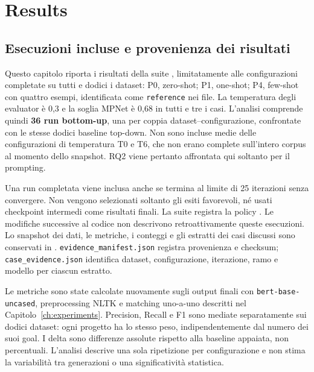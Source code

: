\chapter{Results}
\label{ch:results}

\section{Esecuzioni incluse e provenienza dei risultati}
Questo capitolo riporta i risultati della suite
, limitatamente alle configurazioni
completate su tutti e dodici i dataset: P0, zero-shot; P1, one-shot;
P4, few-shot con quattro esempi, identificata come \texttt{reference} nei file.
La temperatura degli evaluator \`e 0,3 e la soglia MPNet \`e 0,68 in tutti
e tre i casi. L'analisi comprende quindi \textbf{36 run bottom-up}, una
per coppia dataset--configurazione, confrontate con le stesse dodici
baseline top-down. Non sono incluse medie delle configurazioni di
temperatura T0 e T6, che non erano complete sull'intero corpus al momento
dello snapshot. RQ2 viene pertanto affrontata qui soltanto per il prompting.

Una run completata viene inclusa anche se termina al limite di 25
iterazioni senza convergere. Non vengono selezionati soltanto gli esiti
favorevoli, n\'e usati checkpoint intermedi come risultati finali.
La suite registra la policy
.
Le modifiche successive al codice non descrivono retroattivamente queste
esecuzioni. Lo snapshot dei dati, le metriche, i conteggi e gli estratti
dei casi discussi sono conservati in
.
\texttt{evidence\_manifest.json} registra provenienza e checksum;
\texttt{case\_evidence.json} identifica dataset, configurazione,
iterazione, ramo e modello per ciascun estratto.

Le metriche sono state calcolate nuovamente sugli output finali con
\texttt{bert-base-uncased}, preprocessing NLTK e matching uno-a-uno
descritti nel Capitolo~\ref{ch:experiments}. Precision, Recall e F1 sono
mediate separatamente sui dodici dataset: ogni progetto ha lo stesso
peso, indipendentemente dal numero dei suoi goal. I delta sono differenze
assolute rispetto alla baseline appaiata, non percentuali. L'analisi
descrive una sola ripetizione per configurazione e non stima la
variabilit\`a tra generazioni o una significativit\`a statistica.

